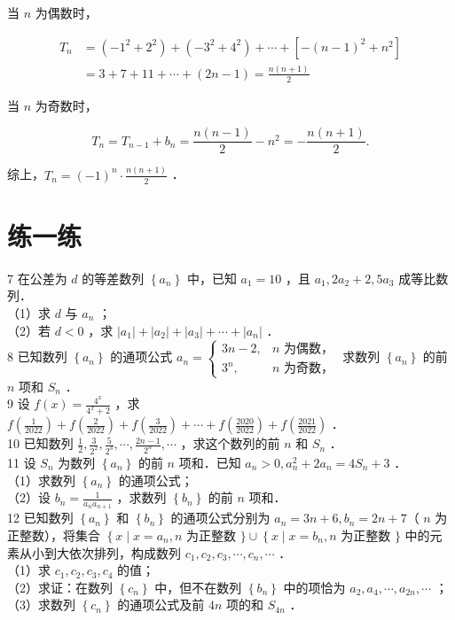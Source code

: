 \documentclass[10pt]{article}
\begin{document}
当 \(n\) 为偶数时，

\[
\begin{aligned}
T_{n} & =\left(-1^{2}+2^{2}\right)+\left(-3^{2}+4^{2}\right)+\cdots+\left[-(n-1)^{2}+n^{2}\right] \\
& =3+7+11+\cdots+(2 n-1)=\frac{n(n+1)}{2}
\end{aligned}
\]

当 \(n\) 为奇数时，

\[
T_{n}=T_{n-1}+b_{n}=\frac{n(n-1)}{2}-n^{2}=-\frac{n(n+1)}{2} .
\]

综上，\(T_{n}=(-1)^{n} \cdot \frac{n(n+1)}{2}\) ．

\section*{练一练}
7 在公差为 \(d\) 的等差数列 \(\left\{a_{n}\right\}\) 中，已知 \(a_{1}=10\) ，且 \(a_{1}, 2 a_{2}+2,5 a_{3}\) 成等比数列．\\
（1）求 \(d\) 与 \(a_{n}\) ；\\
（2）若 \(d<0\) ，求 \(\left|a_{1}\right|+\left|a_{2}\right|+\left|a_{3}\right|+\cdots+\left|a_{n}\right|\) ．\\
8 已知数列 \(\left\{a_{n}\right\}\) 的通项公式 \(a_{n}=\left\{\begin{array}{ll}3 n-2, & n \text { 为偶数，} \\ 3^{n}, & n \text { 为奇数，}\end{array}\right.\) 求数列 \(\left\{a_{n}\right\}\) 的前 \(n\) 项和 \(S_{n}\) ．\\
9 设 \(f(x)=\frac{4^{x}}{4^{x}+2}\) ，求 \(f\left(\frac{1}{2022}\right)+f\left(\frac{2}{2022}\right)+f\left(\frac{3}{2022}\right)+\cdots+f\left(\frac{2020}{2022}\right)+f\left(\frac{2021}{2022}\right)\) ．\\
10 已知数列 \(\frac{1}{2}, \frac{3}{2^{2}}, \frac{5}{2^{3}}, \cdots, \frac{2 n-1}{2^{n}}, \cdots\) ，求这个数列的前 \(n\) 和 \(S_{n}\) ．\\
11 设 \(S_{n}\) 为数列 \(\left\{a_{n}\right\}\) 的前 \(n\) 项和．已知 \(a_{n}>0, a_{n}^{2}+2 a_{n}=4 S_{n}+3\) ．\\
（1）求数列 \(\left\{a_{n}\right\}\) 的通项公式；\\
（2）设 \(b_{n}=\frac{1}{a_{n} a_{n+1}}\) ，求数列 \(\left\{b_{n}\right\}\) 的前 \(n\) 项和．\\
12 已知数列 \(\left\{a_{n}\right\}\) 和 \(\left\{b_{n}\right\}\) 的通项公式分别为 \(a_{n}=3 n+6, b_{n}=2 n+7\)（ \(n\) 为正整数），将集合 \(\left\{x \mid x=a_{n}, n\right.\) 为正整数 \(\} \cup\left\{x \mid x=b_{n}, n\right.\) 为正整数 \(\}\) 中的元素从小到大依次排列，构成数列 \(c_{1}, c_{2}, c_{3}, \cdots, c_{n}, \cdots\) ．\\
（1）求 \(c_{1}, c_{2}, c_{3}, c_{4}\) 的值；\\
（2）求证：在数列 \(\left\{c_{n}\right\}\) 中，但不在数列 \(\left\{b_{n}\right\}\) 中的项恰为 \(a_{2}, a_{4}, \cdots, a_{2 n}, \cdots\) ；\\
（3）求数列 \(\left\{c_{n}\right\}\) 的通项公式及前 \(4 n\) 项的和 \(S_{4 n}\) ．
\end{document}
